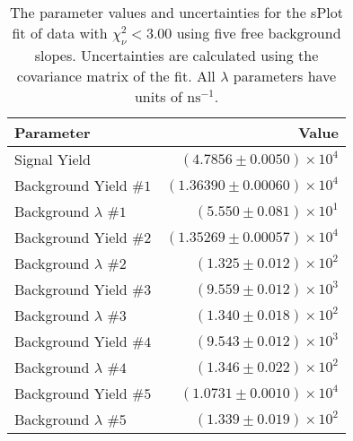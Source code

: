 
\begin{table}[ht]
    \begin{center}
        \begin{tabular}{lr}\toprule
            Parameter & Value \\\midrule
            Signal Yield & $(4.7856 \pm 0.0050) \times 10^{4}$ \\
            Background Yield $\#1$ & $(1.36390 \pm 0.00060) \times 10^{4}$ \\
            Background $\lambda$ $\#1$ & $(5.550 \pm 0.081) \times 10^{1}$ \\
            Background Yield $\#2$ & $(1.35269 \pm 0.00057) \times 10^{4}$ \\
            Background $\lambda$ $\#2$ & $(1.325 \pm 0.012) \times 10^{2}$ \\
            Background Yield $\#3$ & $(9.559 \pm 0.012) \times 10^{3}$ \\
            Background $\lambda$ $\#3$ & $(1.340 \pm 0.018) \times 10^{2}$ \\
            Background Yield $\#4$ & $(9.543 \pm 0.012) \times 10^{3}$ \\
            Background $\lambda$ $\#4$ & $(1.346 \pm 0.022) \times 10^{2}$ \\
            Background Yield $\#5$ & $(1.0731 \pm 0.0010) \times 10^{4}$ \\
            Background $\lambda$ $\#5$ & $(1.339 \pm 0.019) \times 10^{2}$ \\\bottomrule
        \end{tabular}
        \caption{The parameter values and uncertainties for the sPlot fit of data with $\chi^2_\nu < 3.00$ using five free background slopes. Uncertainties are calculated using the covariance matrix of the fit. All $\lambda$ parameters have units of $\si{\nano\second}^{-1}$.}\label{tab:splot-fit-results-chisqdof-3.00-free-5}
    \end{center}
\end{table}
